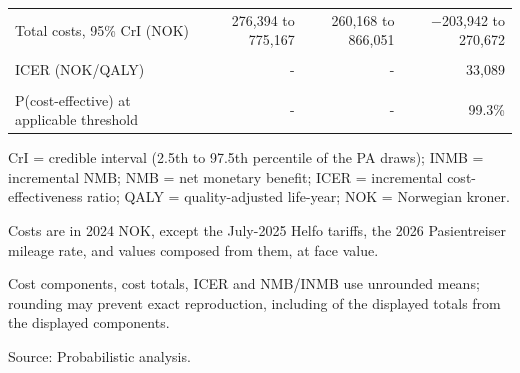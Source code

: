 \begin{table}[H]
{\begin{threeparttable}
\begin{tabular}[t]{lrrr}
\textcolor[HTML]{2D3748}{Total costs, 95\% CrI (NOK)} & \textcolor[HTML]{2D3748}{276,394 to 775,167} & \textcolor[HTML]{2D3748}{260,168 to 866,051} & \textcolor[HTML]{2D3748}{−203,942 to 270,672}\\
\cellcolor[HTML]{F7F9FC}{\textcolor[HTML]{2D3748}{NMB at applicable threshold (NOK)}} & \cellcolor[HTML]{F7F9FC}{\textcolor[HTML]{2D3748}{3,440,527}} & \cellcolor[HTML]{F7F9FC}{\textcolor[HTML]{2D3748}{3,751,339}} & \cellcolor[HTML]{F7F9FC}{\textcolor[HTML]{2D3748}{310,812}}\\
\textcolor[HTML]{2D3748}{ICER (NOK/QALY)} & \textcolor[HTML]{2D3748}{-} & \textcolor[HTML]{2D3748}{-} & \textcolor[HTML]{2D3748}{33,089}\\
\cellcolor[HTML]{F7F9FC}{\textcolor[HTML]{2D3748}{INMB 95\% credible interval (NOK)}} & \cellcolor[HTML]{F7F9FC}{\textcolor[HTML]{2D3748}{-}} & \cellcolor[HTML]{F7F9FC}{\textcolor[HTML]{2D3748}{-}} & \cellcolor[HTML]{F7F9FC}{\textcolor[HTML]{2D3748}{76,377 to 528,429}}\\
\textcolor[HTML]{2D3748}{P(cost-effective) at applicable threshold} & \textcolor[HTML]{2D3748}{-} & \textcolor[HTML]{2D3748}{-} & \textcolor[HTML]{2D3748}{99.3\%}\\
\bottomrule
\end{tabular}
\begin{tablenotes}
\item CrI = credible interval (2.5th to 97.5th percentile of the PA draws); INMB = incremental NMB; NMB = net monetary benefit; ICER = incremental cost-effectiveness ratio; QALY = quality-adjusted life-year; NOK = Norwegian kroner.
\item Costs are in 2024 NOK, except the July-2025 Helfo tariffs, the 2026 Pasientreiser mileage rate, and values composed from them, at face value.
\item Cost components, cost totals, ICER and NMB/INMB use unrounded means; rounding may prevent exact reproduction, including of the displayed totals from the displayed components.
\item Source: Probabilistic analysis.
\end{tablenotes}
\end{threeparttable}
}
\end{table}
